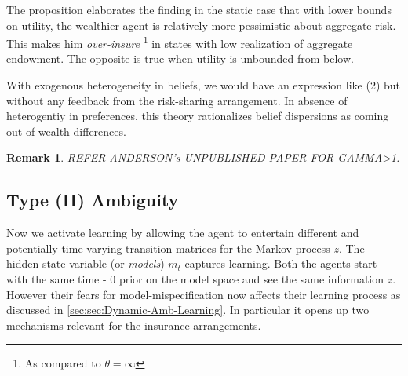 \documentclass[12pt]{article}
\newtheorem{remark}{Remark}
\begin{document}
The proposition elaborates the finding in the static case that with lower bounds on utility, the wealthier agent is relatively more pessimistic about aggregate risk. This makes him \emph{over-insure} \footnote{As compared to $\theta=\infty$} in states with low realization of aggregate endowment. The opposite is true when utility is unbounded from below.

\noindent With exogenous heterogeneity in beliefs, we would have an expression like (2) but without any feedback from the risk-sharing arrangement. In absence of heterogentiy in preferences, this theory rationalizes belief dispersions as coming out of wealth differences. 
\begin{remark}
REFER ANDERSON's UNPUBLISHED PAPER FOR GAMMA>1.
\end{remark}

\subsection{Type (II) Ambiguity}
Now we activate learning by allowing the agent to entertain different and potentially time varying transition matrices for the Markov process $z$. The hidden-state variable (or \emph{models}) $m_t$ captures learning. Both the agents start with the same time - 0 prior on the model space and see the same information $z$. However their fears for model-mispecification now affects their learning process as discussed in \ref{sec:sec:Dynamic-Amb-Learning}. In particular it opens up two mechanisms relevant for the insurance arrangements.
\end{document}
